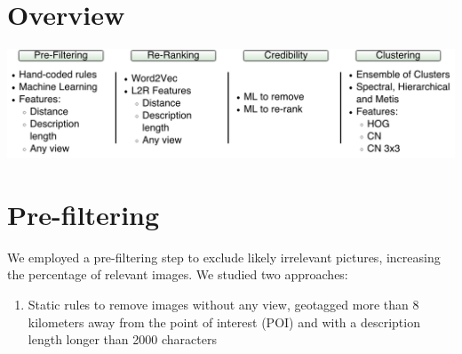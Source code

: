 \documentclass[a0,portrait]{a0poster}
\begin{document}
\vspace{1cm} %


\begin{multicols}{2} %


\large
\color{Navy} %
\section*{Overview}

\begin{center}
\includegraphics[width=1.05\linewidth]{overview_mediaeval}
\end{center}\vspace{0.5cm}


\section*{Pre-filtering}
\large
\color{DarkSlateGray} %

We employed a pre-filtering step to exclude likely irrelevant pictures, increasing the percentage of relevant images.
We studied two approaches: 
\begin{enumerate}
\item Static rules to remove images without any view, geotagged more than 8 kilometers away from the point of interest (POI)
and with a description length longer than 2000 characters


\end{enumerate}
\end{multicols}
\end{document}
